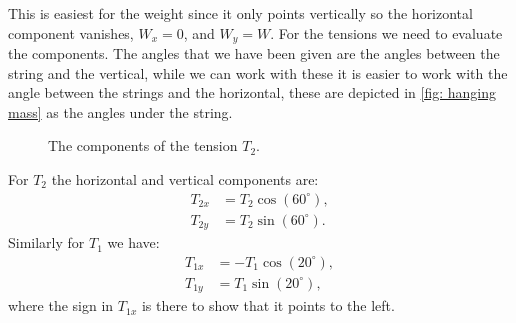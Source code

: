 This is easiest for the weight since it only points vertically so the horizontal component vanishes, $W_{x}=0$, and $W_{y}=W$. For the tensions we need to evaluate the components. The angles that we have been given are the angles between the string and the vertical, while we can work with these it is easier to work with the angle between the strings and the horizontal, these are depicted in \cref{fig: hanging mass} as the angles under the string.

\begin{figure}[ht]
    \centering
    \caption{The components of the tension $T_{2}$.}
    \label{fig: Tension components}
\end{figure}

For $T_{2}$ the horizontal and vertical components are:
\begin{align*}
T_{2x}&=T_{2}\cos(60^{\circ}),\\
T_{2y}&=T_{2}\sin(60^{\circ}).
\end{align*}
Similarly for $T_{1}$ we have:
\begin{align*}
T_{1x}&=-T_{1}\cos(20^{\circ}),\\
T_{1y}&=T_{1}\sin(20^{\circ}),
\end{align*}
where the sign in $T_{1x}$ is there to show that it points to the left.\\

